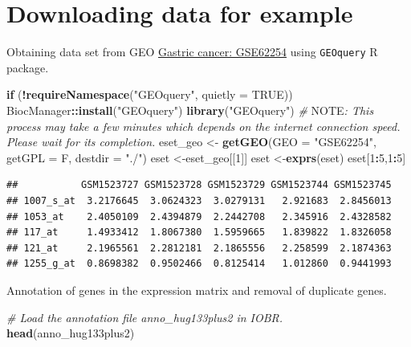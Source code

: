 \documentclass[
  12pt,
]{book}
\newenvironment{Shaded}{\begin{snugshade}}{\end{snugshade}}
\newcommand{\AlertTok}[1]{\textcolor[rgb]{0.94,0.16,0.16}{#1}}
\newcommand{\AttributeTok}[1]{\textcolor[rgb]{0.13,0.29,0.53}{#1}}
\newcommand{\CommentTok}[1]{\textcolor[rgb]{0.56,0.35,0.01}{\textit{#1}}}
\newcommand{\ConstantTok}[1]{\textcolor[rgb]{0.56,0.35,0.01}{#1}}
\newcommand{\ControlFlowTok}[1]{\textcolor[rgb]{0.13,0.29,0.53}{\textbf{#1}}}
\newcommand{\DecValTok}[1]{\textcolor[rgb]{0.00,0.00,0.81}{#1}}
\newcommand{\FunctionTok}[1]{\textcolor[rgb]{0.13,0.29,0.53}{\textbf{#1}}}
\newcommand{\NormalTok}[1]{#1}
\newcommand{\OtherTok}[1]{\textcolor[rgb]{0.56,0.35,0.01}{#1}}
\newcommand{\SpecialCharTok}[1]{\textcolor[rgb]{0.81,0.36,0.00}{\textbf{#1}}}
\newcommand{\StringTok}[1]{\textcolor[rgb]{0.31,0.60,0.02}{#1}}
\begin{document}
\hypertarget{downloading-data-for-example-1}{%
\section{Downloading data for example}\label{downloading-data-for-example-1}}

Obtaining data set from GEO \href{https://pubmed.ncbi.nlm.nih.gov/25894828/}{Gastric cancer: GSE62254} using \texttt{GEOquery} R package.

\begin{Shaded}
\begin{Highlighting}[]
\ControlFlowTok{if}\NormalTok{ (}\SpecialCharTok{!}\FunctionTok{requireNamespace}\NormalTok{(}\StringTok{"GEOquery"}\NormalTok{, }\AttributeTok{quietly =} \ConstantTok{TRUE}\NormalTok{))  BiocManager}\SpecialCharTok{::}\FunctionTok{install}\NormalTok{(}\StringTok{"GEOquery"}\NormalTok{)}
\FunctionTok{library}\NormalTok{(}\StringTok{"GEOquery"}\NormalTok{)}
\CommentTok{\# }\AlertTok{NOTE}\CommentTok{: This process may take a few minutes which depends on the internet connection speed. Please wait for its completion.}
\NormalTok{eset\_geo }\OtherTok{\textless{}{-}} \FunctionTok{getGEO}\NormalTok{(}\AttributeTok{GEO =} \StringTok{"GSE62254"}\NormalTok{, }\AttributeTok{getGPL  =}\NormalTok{ F, }\AttributeTok{destdir =} \StringTok{"./"}\NormalTok{)}
\NormalTok{eset    }\OtherTok{\textless{}{-}}\NormalTok{eset\_geo[[}\DecValTok{1}\NormalTok{]]}
\NormalTok{eset    }\OtherTok{\textless{}{-}}\FunctionTok{exprs}\NormalTok{(eset)}
\NormalTok{eset[}\DecValTok{1}\SpecialCharTok{:}\DecValTok{5}\NormalTok{,}\DecValTok{1}\SpecialCharTok{:}\DecValTok{5}\NormalTok{]}
\end{Highlighting}
\end{Shaded}

\begin{verbatim}
##           GSM1523727 GSM1523728 GSM1523729 GSM1523744 GSM1523745
## 1007_s_at  3.2176645  3.0624323  3.0279131   2.921683  2.8456013
## 1053_at    2.4050109  2.4394879  2.2442708   2.345916  2.4328582
## 117_at     1.4933412  1.8067380  1.5959665   1.839822  1.8326058
## 121_at     2.1965561  2.2812181  2.1865556   2.258599  2.1874363
## 1255_g_at  0.8698382  0.9502466  0.8125414   1.012860  0.9441993
\end{verbatim}

Annotation of genes in the expression matrix and removal of duplicate genes.

\begin{Shaded}
\begin{Highlighting}[]
\CommentTok{\# Load the annotation file \textasciigrave{}anno\_hug133plus2\textasciigrave{} in IOBR.}
\FunctionTok{head}\NormalTok{(anno\_hug133plus2)}
\end{Highlighting}
\end{Shaded}
\end{document}
